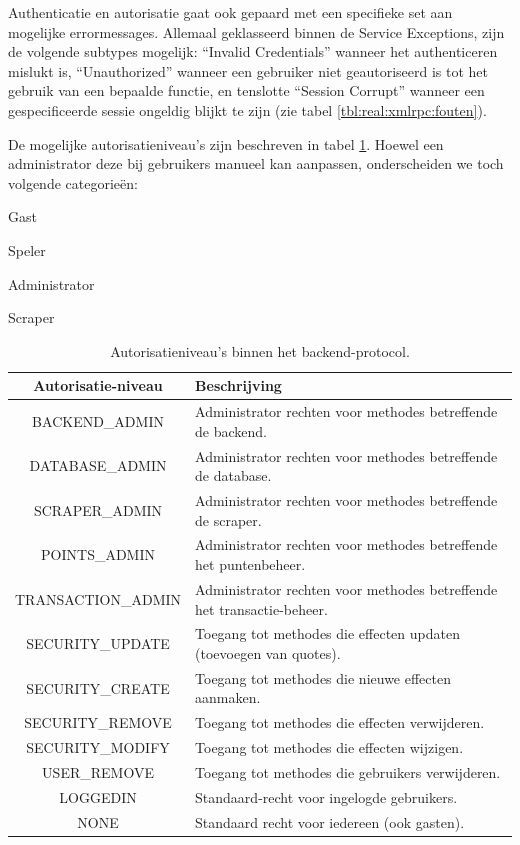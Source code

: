 Authenticatie en autorisatie gaat ook gepaard met een specifieke set aan mogelijke errormessages. Allemaal geklasseerd binnen de Service Exceptions, zijn de volgende subtypes mogelijk: ``Invalid Credentials'' wanneer het authenticeren mislukt is, ``Unauthorized'' wanneer een gebruiker niet geautoriseerd is tot het gebruik van een bepaalde functie, en tenslotte ``Session Corrupt'' wanneer een gespecificeerde sessie ongeldig blijkt te zijn (zie tabel \ref{tbl:real:xmlrpc:fouten}).

De mogelijke autorisatieniveau's zijn beschreven in tabel \ref{tbl:real:xmlrpc:autorisatie}. Hoewel een administrator deze bij gebruikers manueel kan aanpassen, onderscheiden we toch volgende categorie\"en:
\begin{itemize_compact}
\item{Gast}
\item{Speler}
\item{Administrator}
\item{Scraper}
\end{itemize_compact}

\begin{table}
\begin{tabular}{| c p{7cm} |}
	\hline
	Autorisatie-niveau & Beschrijving \\
	\hline
	
	BACKEND\_ADMIN & Administrator rechten voor methodes betreffende de backend. \\
	DATABASE\_ADMIN & Administrator rechten voor methodes betreffende de database. \\
	SCRAPER\_ADMIN & Administrator rechten voor methodes betreffende de scraper. \\
	POINTS\_ADMIN & Administrator rechten voor methodes betreffende het puntenbeheer. \\
	TRANSACTION\_ADMIN & Administrator rechten voor methodes betreffende het transactie-beheer. \\
	
	SECURITY\_UPDATE & Toegang tot methodes die effecten updaten (toevoegen van quotes). \\
	SECURITY\_CREATE & Toegang tot methodes die nieuwe effecten aanmaken. \\
	SECURITY\_REMOVE & Toegang tot methodes die effecten verwijderen. \\
	SECURITY\_MODIFY & Toegang tot methodes die effecten wijzigen. \\
	
	USER\_REMOVE & Toegang tot methodes die gebruikers verwijderen. \\
	
	LOGGEDIN & Standaard-recht voor ingelogde gebruikers. \\
	NONE & Standaard recht voor iedereen (ook gasten). \\
	
	\hline
\end{tabular}
\caption{Autorisatieniveau's binnen het backend-protocol.}
\label{tbl:real:xmlrpc:autorisatie}
\end{table}

